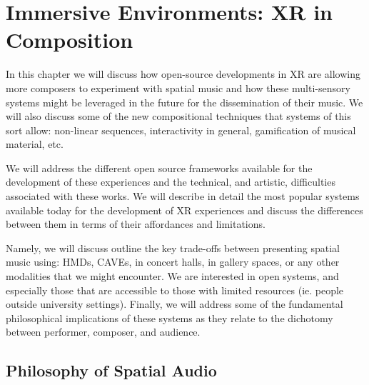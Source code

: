 \chapter{Immersive Environments: XR in Composition}
\label{ch:xr-mus}





In this chapter we will discuss how open-source developments in XR are allowing more composers to experiment with spatial music and how these multi-sensory systems might be leveraged in the future for the dissemination of their music. We will also discuss some of the new compositional techniques that systems of this sort allow: non-linear sequences, interactivity in general, gamification of musical material, etc. 

We will address the different open source frameworks available for the development of these experiences and the technical, and artistic, difficulties associated with these works. We will describe in detail the most popular systems available today for the development of XR experiences and discuss the differences between them in terms of their affordances and limitations.

Namely, we will discuss outline the key trade-offs between presenting spatial music using: HMDs, CAVEs, in concert halls, in gallery spaces, or any other modalities that we might encounter. We are interested in open systems, and especially those that are accessible to those with limited resources (ie. people outside university settings). Finally, we will address some of the fundamental philosophical implications of these systems as they relate to the dichotomy between performer, composer, and audience. 

\section{Philosophy of Spatial Audio}

